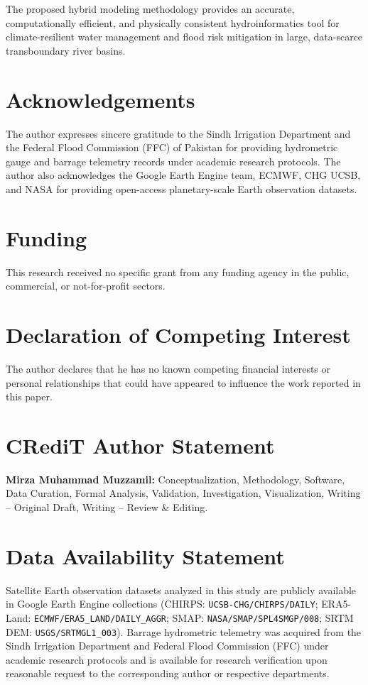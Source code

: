 \documentclass[11pt,a4paper,fleqn]{article}
\begin{document}
The proposed hybrid modeling methodology provides an accurate, computationally efficient, and physically consistent hydroinformatics tool for climate-resilient water management and flood risk mitigation in large, data-scarce transboundary river basins.


\section*{Acknowledgements}
The author expresses sincere gratitude to the Sindh Irrigation Department and the Federal Flood Commission (FFC) of Pakistan for providing hydrometric gauge and barrage telemetry records under academic research protocols. The author also acknowledges the Google Earth Engine team, ECMWF, CHG UCSB, and NASA for providing open-access planetary-scale Earth observation datasets.

\section*{Funding}
This research received no specific grant from any funding agency in the public, commercial, or not-for-profit sectors.

\section*{Declaration of Competing Interest}
The author declares that he has no known competing financial interests or personal relationships that could have appeared to influence the work reported in this paper.

\section*{CRediT Author Statement}
\textbf{Mirza Muhammad Muzzamil:} Conceptualization, Methodology, Software, Data Curation, Formal Analysis, Validation, Investigation, Visualization, Writing -- Original Draft, Writing -- Review \& Editing.

\section*{Data Availability Statement}
Satellite Earth observation datasets analyzed in this study are publicly available in Google Earth Engine collections (CHIRPS: \texttt{UCSB-CHG/CHIRPS/DAILY}; ERA5-Land: \texttt{ECMWF/ERA5\_LAND/DAILY\_AGGR}; SMAP: \texttt{NASA/SMAP/SPL4SMGP/008}; SRTM DEM: \texttt{USGS/SRTMGL1\_003}). Barrage hydrometric telemetry was acquired from the Sindh Irrigation Department and Federal Flood Commission (FFC) under academic research protocols and is available for research verification upon reasonable request to the corresponding author or respective departments.
\end{document}
